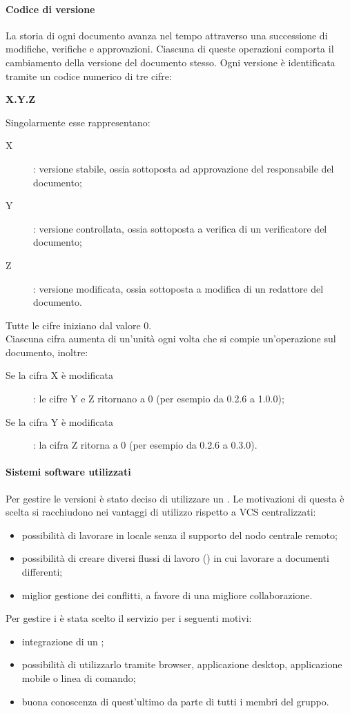 \paragraph{Codice di versione}
La storia di ogni documento avanza nel tempo attraverso una successione di modifiche, verifiche e approvazioni. Ciascuna di queste operazioni comporta il cambiamento della versione del documento stesso. Ogni versione è identificata tramite un codice numerico di tre cifre:
\begin{center}
\textbf{X.Y.Z} 
\end{center}
Singolarmente esse rappresentano:
\begin{description}
  	\item[X] : versione stabile, ossia sottoposta ad approvazione del responsabile del documento;
  	\item[Y] : versione controllata, ossia sottoposta a verifica di un verificatore del documento;
  	\item[Z] : versione modificata, ossia sottoposta a modifica di un redattore del documento.
\end{description}
Tutte le cifre iniziano dal valore 0. \\ 
Ciascuna cifra aumenta di un'unità ogni volta che si compie un'operazione sul documento, inoltre:
\begin{description}
	\item[Se la cifra X è modificata] : le cifre Y e Z ritornano a 0 (per esempio da 0.2.6 a 1.0.0);
	\item[Se la cifra Y è modificata] : la cifra Z ritorna a 0 (per esempio da 0.2.6 a 0.3.0).
\end{description}

\paragraph{Sistemi software utilizzati}
Per gestire le versioni è stato deciso di utilizzare un  . 
Le motivazioni di questa è scelta si racchiudono nei vantaggi di utilizzo rispetto a VCS centralizzati:
\begin{itemize}
	\item possibilità di lavorare in locale senza il supporto del nodo centrale remoto; 
	\item possibilità di creare diversi flussi di lavoro () in cui lavorare a documenti differenti;
	\item miglior gestione dei conflitti, a favore di una migliore collaborazione.
\end{itemize}
Per gestire i   è stata scelto il servizio  per i seguenti motivi: 
\begin{itemize}
	\item integrazione di un ;
	\item possibilità di utilizzarlo tramite browser, applicazione desktop, applicazione mobile o linea di comando;
	\item buona conoscenza di quest'ultimo da parte di tutti i membri del gruppo.
\end{itemize}


